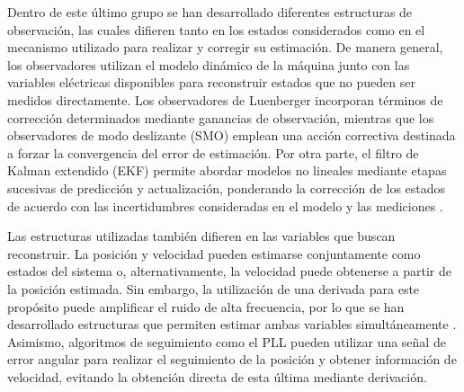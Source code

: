 Dentro de este último grupo se han desarrollado diferentes estructuras de observación, las cuales difieren tanto en los estados considerados como en el mecanismo utilizado para realizar y corregir su estimación. De manera general, los observadores utilizan el modelo dinámico de la máquina junto con las variables eléctricas disponibles para reconstruir estados que no pueden ser medidos directamente. Los observadores de Luenberger incorporan términos de corrección determinados mediante ganancias de observación, mientras que los observadores de modo deslizante (SMO) emplean una acción correctiva destinada a forzar la convergencia del error de estimación. Por otra parte, el filtro de Kalman extendido (EKF) permite abordar modelos no lineales mediante etapas sucesivas de predicción y actualización, ponderando la corrección de los estados de acuerdo con las incertidumbres consideradas en el modelo y las mediciones \cite{luoOptimizedLuenbergerObserverBased2022}.

Las estructuras utilizadas también difieren en las variables que buscan reconstruir. La posición y velocidad pueden estimarse conjuntamente como estados del sistema o, alternativamente, la velocidad puede obtenerse a partir de la posición estimada. Sin embargo, la utilización de una derivada para este propósito puede amplificar el ruido de alta frecuencia, por lo que se han desarrollado estructuras que permiten estimar ambas variables simultáneamente \cite{wangPositionSensorlessPermanent2020}. Asimismo, algoritmos de seguimiento como el PLL pueden utilizar una señal de error angular para realizar el seguimiento de la posición y obtener información de velocidad, evitando la obtención directa de esta última mediante derivación. 
%
%
%
%
%
%
%
%
%

